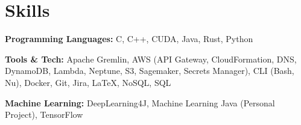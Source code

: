 ﻿
\section{Skills}

\textbf{Programming Languages: } C, C++, CUDA, Java, Rust, Python

\bigbreak

\textbf{Tools \& Tech: } Apache Gremlin, AWS (API Gateway, CloudFormation, DNS, DynamoDB, Lambda, Neptune, S3, Sagemaker, Secrets Manager), CLI (Bash, Nu), Docker, Git, Jira, \LaTeX, NoSQL, SQL

\bigbreak

\textbf{Machine Learning: } DeepLearning4J, Machine Learning Java (Personal Project), TensorFlow